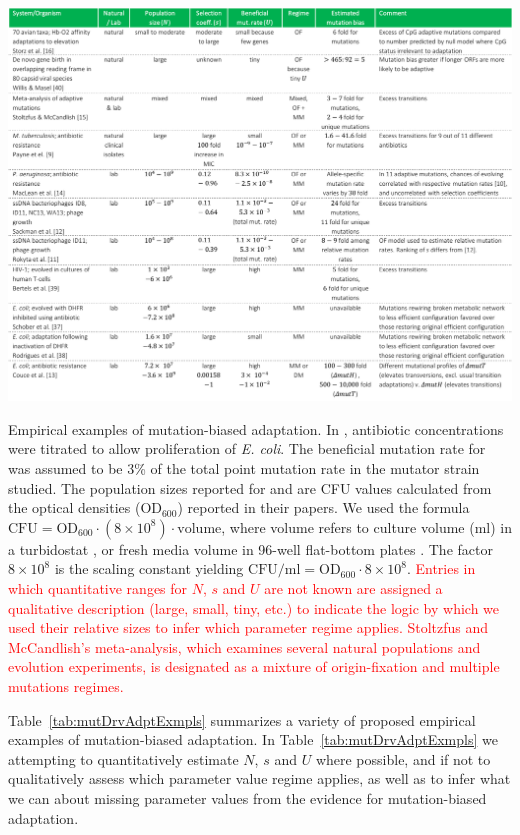\documentclass[9pt,twocolumn,twoside]{article}
\begin{document}
\begin{table}[ht!]
    \centering
    \includegraphics[scale=0.87]{tab_mut_biased_adapt_exmpls.pdf}
    \caption{\label{tab:mutDrvAdptExmpls} \footnotesize Empirical examples of mutation-biased adaptation. In \citet{Couce2015}, antibiotic concentrations were titrated to allow proliferation of \textit{E. coli}. The beneficial mutation rate for \citep{Couce2015} was assumed to be 3\% of the total point mutation rate in the mutator strain studied. The population sizes reported for \citet{schober2019two} and \citet{rodrigues2019adaptation} are CFU values calculated from the optical densities ($\text{OD}_{600}$) reported in their papers. We used the formula $\text{CFU}=\text{OD}_{600}\cdot (8 \times 10^8) \cdot \text{volume}$, where volume refers to culture volume (ml) in a turbidostat \citep{schober2019two}, or fresh media volume in 96-well flat-bottom plates \citep{rodrigues2019adaptation}. The factor $8 \times 10^8$ is the scaling constant yielding $\text{CFU/ml}=\text{OD}_{600}\cdot 8 \times 10^8$. \textcolor{red}{Entries in which quantitative ranges for $N$, $s$ and $U$ are not known are assigned a qualitative description (large, small, tiny, etc.) to indicate the logic by which we used their relative sizes to infer which parameter regime applies. Stoltzfus and McCandlish's \cite{Stoltzfus2017parallel} meta-analysis, which examines several natural populations and evolution experiments, is designated as a mixture of origin-fixation and multiple mutations regimes.}}
\end{table}

Table~\ref{tab:mutDrvAdptExmpls} summarizes a variety of proposed empirical examples of mutation-biased adaptation. In Table~\ref{tab:mutDrvAdptExmpls} we attempting to quantitatively estimate $N$, $s$ and $U$ where possible, and if not to qualitatively assess which parameter value regime applies, as well as to infer what we can about missing parameter values from the evidence for mutation-biased adaptation. 
\end{document}
